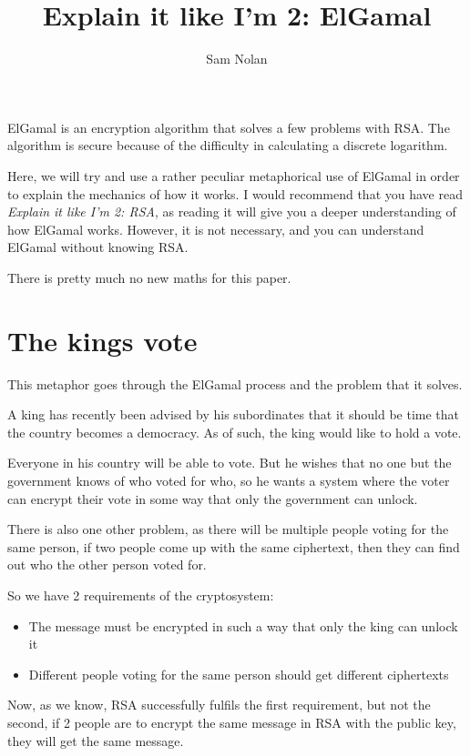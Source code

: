 \documentclass{article}
\title{Explain it like I'm 2: ElGamal}
\author{Sam Nolan}
\begin{document}
  \maketitle

  ElGamal is an encryption algorithm that solves a few problems with RSA. The
  algorithm is secure because of the difficulty in calculating a discrete
  logarithm.

  Here, we will try and use a rather peculiar metaphorical use of ElGamal in
  order to explain the mechanics of how it works. I would recommend that you
  have read \textit{Explain it like I'm 2: RSA}, as reading it will give you
  a deeper understanding of how ElGamal works. However, it is not necessary,
  and you can understand ElGamal without knowing RSA.

  There is pretty much no new maths for this paper.

  \section*{The kings vote}
  This metaphor goes through the ElGamal process and the problem that it solves.

  A king has recently been advised by his subordinates that it should be time
  that the country becomes a democracy. As of such, the king would like to hold
  a vote.

  Everyone in his country will be able to vote. But he wishes that no one but
  the government knows of who voted for who, so he wants a system where the
  voter can encrypt their vote in some way that only the government can unlock.

  There is also one other problem, as there will be multiple people voting for
  the same person, if two people come up with the same ciphertext, then they
  can find out who the other person voted for.

  So we have 2 requirements of the cryptosystem:
  \begin{itemize}
    \item The message must be encrypted in such a way that only the king can unlock it
    \item Different people voting for the same person should get different ciphertexts
  \end{itemize}

  Now, as we know, RSA successfully fulfils the first requirement, but not the
  second, if 2 people are to encrypt the same message in RSA with the public
  key, they will get the same message.
\end{document}
